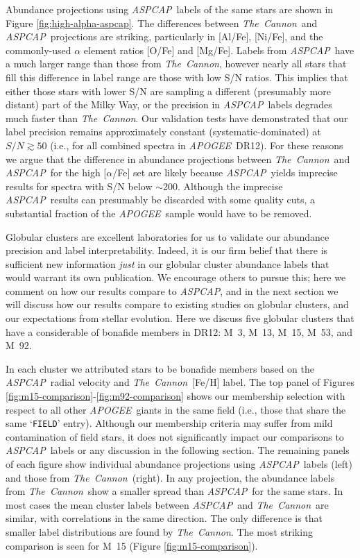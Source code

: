 \documentclass[12pt,preprint]{aastex}
\newcommand{\project}[1]{\textsl{#1}}
\newcommand{\TheCannon}{\project{The~Cannon}}
\newcommand{\acronym}[1]{{\small{#1}}}
\newcommand{\apogee}{\project{\acronym{APOGEE}}}
\newcommand{\aspcap}{\project{\acronym{ASPCAP}}}
\newcommand{\dr}{\acronym{DR12}}
\begin{document}
Abundance projections using \aspcap\ labels of the same stars are shown
in Figure \ref{fig:high-alpha-aspcap}.  The differences between \TheCannon\
and \aspcap\ projections are striking, particularly in [Al/Fe], [Ni/Fe],
and the commonly-used $\alpha$ element ratios [O/Fe] and [Mg/Fe].  Labels
from \aspcap\ have a much larger range than those from \TheCannon,
however nearly all stars that fill this difference in label range are those
with low S/N ratios.  This implies that either those stars with lower S/N
are sampling a different (presumably more distant) part of the Milky Way,
or the precision in \aspcap\ labels degrades much faster than \TheCannon.
Our validation tests have demonstrated that our label precision remains
approximately constant (systematic-dominated) at $S/N \gtrsim 50$ (i.e.,
for all combined spectra in \apogee\ \dr).  For these reasons we argue
that the difference in abundance projections between \TheCannon\ and
\aspcap\ for the high [$\alpha$/Fe] set are likely because \aspcap\
yields imprecise results for spectra with S/N below $\sim$200.  Although
the imprecise \aspcap\ results can presumably be discarded with some 
quality cuts, a substantial fraction of the \apogee\ sample would have
to be removed.


Globular clusters are excellent laboratories for us to validate
our abundance precision and label interpretability.  Indeed, it is our
firm belief that there is sufficient new information \emph{just} in our
globular cluster abundance labels that would warrant its own publication.
We encourage others to pursue this; here we comment on how our results 
compare to \aspcap, and in the next section we will discuss how our
results compare to existing studies on globular clusters, and our
expectations from stellar evolution.  Here we discuss five globular
clusters that have a considerable of bonafide members in \dr: M~3, M~13,
M~15, M~53, and M~92.  


In each cluster we attributed stars to be bonafide members based on the
\aspcap\ radial velocity and \TheCannon\ [Fe/H] label.  The top panel of
Figures \ref{fig:m15-comparison}-\ref{fig:m92-comparison} shows our 
membership selection with respect to all other \apogee\ giants in the
same field (i.e., those that share the same `\texttt{FIELD}' entry).
Although our membership criteria may suffer from mild contamination of
field stars, it does not significantly impact our comparisons to 
\aspcap\ labels or any discussion in the following section.  The 
remaining panels of each figure show individual abundance projections
using \aspcap\ labels (left) and those from \TheCannon\ (right). 
In any projection, the abundance labels from \TheCannon\ show a smaller
spread than \aspcap\ for the same stars.  In most cases the mean cluster
labels between \aspcap\ and \TheCannon\ are similar, with correlations
in the same direction. The only difference is that smaller label
distributions are found by \TheCannon.  The most striking comparison 
is seen for M~15 (Figure \ref{fig:m15-comparison}).
\end{document}
